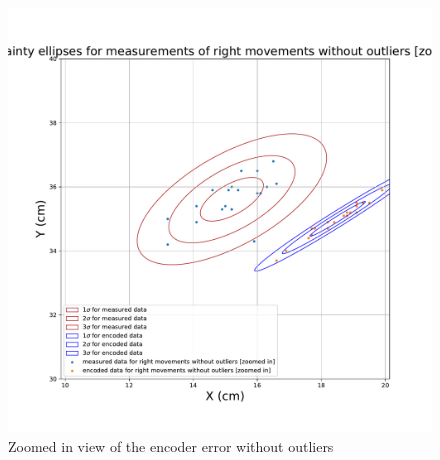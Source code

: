          \begin{figure}[!ht] 
            \centering 
            \includegraphics[page={1}, scale=.30]{images/pdf/ellipses_right_measured_vs_good_encoded_zoomed_in.pdf}
            \caption{Zoomed in view  of the encoder error without outliers}
            \label{fig:encoder-7}
    \end{figure}
    
    
    
    
    
    


    

